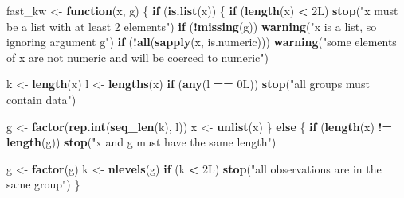 \documentclass[
]{article}
\newenvironment{Shaded}{\begin{snugshade}}{\end{snugshade}}
\newcommand{\ControlFlowTok}[1]{\textcolor[rgb]{0.13,0.29,0.53}{\textbf{#1}}}
\newcommand{\DataTypeTok}[1]{\textcolor[rgb]{0.13,0.29,0.53}{#1}}
\newcommand{\DecValTok}[1]{\textcolor[rgb]{0.00,0.00,0.81}{#1}}
\newcommand{\FunctionTok}[1]{\textcolor[rgb]{0.13,0.29,0.53}{\textbf{#1}}}
\newcommand{\NormalTok}[1]{#1}
\newcommand{\OtherTok}[1]{\textcolor[rgb]{0.56,0.35,0.01}{#1}}
\newcommand{\SpecialCharTok}[1]{\textcolor[rgb]{0.81,0.36,0.00}{\textbf{#1}}}
\newcommand{\StringTok}[1]{\textcolor[rgb]{0.31,0.60,0.02}{#1}}
\begin{document}
\begin{Shaded}
\begin{Highlighting}[]
\NormalTok{fast\_kw }\OtherTok{\textless{}{-}} \ControlFlowTok{function}\NormalTok{(x, g) \{}
  \ControlFlowTok{if}\NormalTok{ (}\FunctionTok{is.list}\NormalTok{(x)) \{}
    \ControlFlowTok{if}\NormalTok{ (}\FunctionTok{length}\NormalTok{(x) }\SpecialCharTok{\textless{}} \DecValTok{2}\DataTypeTok{L}\NormalTok{)}
      \FunctionTok{stop}\NormalTok{(}\StringTok{"\textquotesingle{}x\textquotesingle{} must be a list with at least 2 elements"}\NormalTok{)}
    \ControlFlowTok{if}\NormalTok{ (}\SpecialCharTok{!}\FunctionTok{missing}\NormalTok{(g))}
      \FunctionTok{warning}\NormalTok{(}\StringTok{"\textquotesingle{}x\textquotesingle{} is a list, so ignoring argument \textquotesingle{}g\textquotesingle{}"}\NormalTok{)}
    \ControlFlowTok{if}\NormalTok{ (}\SpecialCharTok{!}\FunctionTok{all}\NormalTok{(}\FunctionTok{sapply}\NormalTok{(x, is.numeric)))}
      \FunctionTok{warning}\NormalTok{(}\StringTok{"some elements of \textquotesingle{}x\textquotesingle{} are not numeric and will be coerced to numeric"}\NormalTok{)}
    
\NormalTok{    k }\OtherTok{\textless{}{-}} \FunctionTok{length}\NormalTok{(x)}
\NormalTok{    l }\OtherTok{\textless{}{-}} \FunctionTok{lengths}\NormalTok{(x)}
    \ControlFlowTok{if}\NormalTok{ (}\FunctionTok{any}\NormalTok{(l }\SpecialCharTok{==} \DecValTok{0}\DataTypeTok{L}\NormalTok{))}
      \FunctionTok{stop}\NormalTok{(}\StringTok{"all groups must contain data"}\NormalTok{)}
    
\NormalTok{    g }\OtherTok{\textless{}{-}} \FunctionTok{factor}\NormalTok{(}\FunctionTok{rep.int}\NormalTok{(}\FunctionTok{seq\_len}\NormalTok{(k), l))}
\NormalTok{    x }\OtherTok{\textless{}{-}} \FunctionTok{unlist}\NormalTok{(x)}
\NormalTok{  \}}
  \ControlFlowTok{else}\NormalTok{ \{}
    \ControlFlowTok{if}\NormalTok{ (}\FunctionTok{length}\NormalTok{(x) }\SpecialCharTok{!=} \FunctionTok{length}\NormalTok{(g))}
      \FunctionTok{stop}\NormalTok{(}\StringTok{"\textquotesingle{}x\textquotesingle{} and \textquotesingle{}g\textquotesingle{} must have the same length"}\NormalTok{)}
    
\NormalTok{    g }\OtherTok{\textless{}{-}} \FunctionTok{factor}\NormalTok{(g)}
\NormalTok{    k }\OtherTok{\textless{}{-}} \FunctionTok{nlevels}\NormalTok{(g)}
    \ControlFlowTok{if}\NormalTok{ (k }\SpecialCharTok{\textless{}} \DecValTok{2}\DataTypeTok{L}\NormalTok{)}
      \FunctionTok{stop}\NormalTok{(}\StringTok{"all observations are in the same group"}\NormalTok{)}
\NormalTok{  \}}
  

\end{Highlighting}
\end{Shaded}
\end{document}
